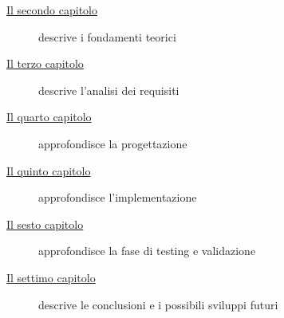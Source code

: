 \begin{description}
    \item[{\hyperref[cap:fondamentiteorici]{Il secondo capitolo}}] descrive i fondamenti teorici
    
    \item[{\hyperref[cap:analisi-requisiti]{Il terzo capitolo}}] descrive l'analisi dei requisiti
    
    \item[{\hyperref[cap:progettazione]{Il quarto capitolo}}] approfondisce la progettazione
    
    \item[{\hyperref[cap:implementazione]{Il quinto capitolo}}] approfondisce l'implementazione
    
    \item[{\hyperref[cap:testing]{Il sesto capitolo}}] approfondisce la fase di testing e validazione
    
    \item[{\hyperref[cap:conclusioni]{Il settimo capitolo}}] descrive le conclusioni e i possibili sviluppi futuri
\end{description}

